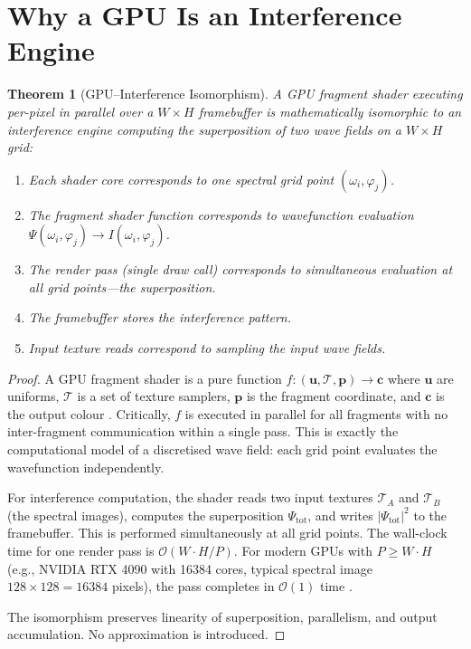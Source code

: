 \documentclass[11pt,twocolumn,a4paper]{article}
\newtheorem{theorem}{Theorem}[section]
\newcommand{\BigO}{\mathcal{O}}
\begin{document}
\section{Why a GPU Is an Interference Engine}
\label{sec:gpu_engine}

\begin{theorem}[GPU--Interference Isomorphism]
\label{thm:gpu_interference}
A GPU fragment shader executing per-pixel in parallel over a
$W \times H$ framebuffer is mathematically isomorphic to an
interference engine computing the superposition of two wave fields
on a $W \times H$ grid:
\begin{enumerate}[label=(\roman*),nosep]
  \item Each shader core corresponds to one spectral grid point
    $(\omega_i, \varphi_j)$.
  \item The fragment shader function corresponds to wavefunction
    evaluation $\Psi(\omega_i, \varphi_j) \to I(\omega_i, \varphi_j)$.
  \item The render pass (single draw call) corresponds to simultaneous
    evaluation at all grid points---the superposition.
  \item The framebuffer stores the interference pattern.
  \item Input texture reads correspond to sampling the input wave fields.
\end{enumerate}
\end{theorem}

\begin{proof}
A GPU fragment shader is a pure function
$f: (\mathbf{u}, \mathcal{T}, \mathbf{p}) \to \mathbf{c}$
where $\mathbf{u}$ are uniforms, $\mathcal{T}$ is a set of texture
samplers, $\mathbf{p}$ is the fragment coordinate, and $\mathbf{c}$ is
the output colour \citep{webgl2spec, vulkanspec, glslspec}. Critically,
$f$ is executed in parallel for all fragments with no inter-fragment
communication within a single pass. This is exactly the computational
model of a discretised wave field: each grid point evaluates the
wavefunction independently.

For interference computation, the shader reads two input textures
$\mathcal{T}_A$ and $\mathcal{T}_B$ (the spectral images), computes the
superposition $\Psi_{\text{tot}}$, and writes $|\Psi_{\text{tot}}|^2$ to
the framebuffer. This is performed simultaneously at all grid points.
The wall-clock time for one render pass is $\BigO(W \cdot H / P)$.
For modern GPUs with $P \geq W \cdot H$ (e.g., NVIDIA RTX 4090 with
16384 cores, typical spectral image $128 \times 128 = 16384$ pixels),
the pass completes in $\BigO(1)$ time \citep{cudaguide}.

The isomorphism preserves linearity of superposition, parallelism,
and output accumulation. No approximation is introduced.
\end{proof}
\end{document}
